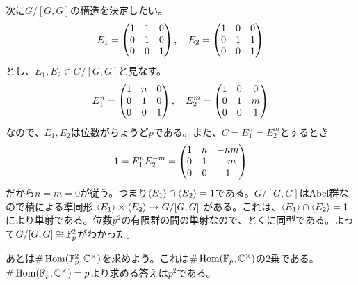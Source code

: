 \begin{sol}
  次に$G/[G,G]$の構造を決定したい。
  \[
  E_1 = \begin{pmatrix} 1 & 1 & 0 \\ 0 & 1 & 0 \\ 0 & 0 & 1 \end{pmatrix}, \quad E_2 =  \begin{pmatrix} 1 & 0 & 0 \\ 0 & 1 & 1 \\ 0 & 0 & 1 \end{pmatrix}
  \]
  とし、$E_1, E_2 \in G/ [G,G]$と見なす。
  \[
  E_1^n = \begin{pmatrix} 1 & n & 0 \\ 0 & 1 & 0 \\ 0 & 0 & 1 \end{pmatrix}, \quad E_2^m =  \begin{pmatrix} 1 & 0 & 0 \\ 0 & 1 & m \\ 0 & 0 & 1 \end{pmatrix}
  \]
  なので、$E_1, E_2$は位数がちょうど$p$である。また、$C = E_1^n = E_2^m$とするとき
  \[
  1 = E_1^n E_2^{-m} = \begin{pmatrix}  1 & n & -nm \\ 0 & 1 & -m \\ 0 & 0 & 1 \end{pmatrix}
  \]
  だから$n=m=0$が従う。つまり$\langle E_1 \rangle \cap \langle E_2 \rangle = 1$である。$G/[G,G]$はAbel群なので積による準同形
  $
\langle E_1 \rangle \times \langle E_2 \rangle \to G/[G,G]
  $
  がある。これは、$\langle E_1 \rangle \cap \langle E_2 \rangle = 1$により単射である。位数$p^2$の有限群の間の単射なので、とくに同型である。よって$G/[G,G] \cong {\mathbb F}_p^2$がわかった。

あとは$\# \operatorname{Hom}({\mathbb F}_p^2, {\mathbb C}^{\times})$を求めよう。これは$\# \operatorname{Hom}({\mathbb F}_p,{\mathbb C}^{\times})$の$2$乗である。$\# \operatorname{Hom}({\mathbb F}_p,{\mathbb C}^{\times}) = p$より求める答えは$p^2$である。

\end{sol}

\newpage

